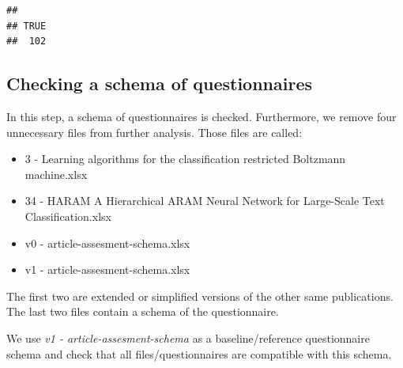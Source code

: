 \documentclass[
]{article}
\providecommand{\tightlist}{%
  \setlength{\itemsep}{0pt}\setlength{\parskip}{0pt}}
\begin{document}
\begin{verbatim}
## 
## TRUE 
##  102
\end{verbatim}

\hypertarget{checking-a-schema-of-questionnaires}{%
\subsection{Checking a schema of questionnaires}\label{checking-a-schema-of-questionnaires}}

In this step, a schema of questionnaires is checked. Furthermore, we remove four unnecessary files from further analysis. Those files are called:

\begin{itemize}
\tightlist
\item
  3 - Learning algorithms for the classification restricted Boltzmann machine.xlsx
\item
  34 - HARAM A Hierarchical ARAM Neural Network for Large-Scale Text Classification.xlsx
\item
  v0 - article-assesment-schema.xlsx
\item
  v1 - article-assesment-schema.xlsx
\end{itemize}

The first two are extended or simplified versions of the other same publications. The last two files contain a schema of the questionnaire.

We use \emph{v1 - article-assesment-schema} as a baseline/reference questionnaire schema and check that all files/questionnaires are compatible with this schema.
\end{document}
